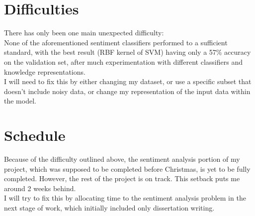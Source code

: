 \documentclass[12pt]{article}
\begin{document}
\section*{Difficulties}
There has only been one main unexpected difficulty:\\

\noindent None of the aforementioned sentiment classifiers performed to a
sufficient standard, with the best result (RBF kernel of SVM) having 
only a 57\% accuracy on the validation set, after much experimentation
with different classifiers and knowledge representations.\\

\noindent I will need to fix this by either changing my dataset, 
or use a specific subset that doesn't include noisy data, 
or change my representation of the input data within the model.\\


\section*{Schedule}
Because of the difficulty outlined above, the sentiment analysis
portion of my project, which was supposed to be completed before
Christmas, is yet to be fully completed. However, the rest of the
project is on track. This setback puts me around 2 weeks behind.\\

\noindent I will try to fix this by allocating time to the sentiment analysis 
problem in the next stage of work, which initially included only 
dissertation writing.
\end{document}
